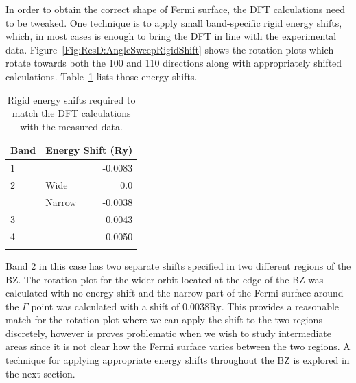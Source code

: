 In order to obtain the correct shape of Fermi surface, the \ac{DFT} calculations need to be tweaked. One technique is to apply small band-specific rigid energy shifts, which, in most cases is enough to bring the \ac{DFT} in line with the experimental data. Figure~\ref{Fig:ResD:AngleSweepRigidShift} shows the rotation plots which rotate towards both the 100 and 110 directions along with appropriately shifted calculations. Table~\ref{Tab:ResD:EnergyShifts} lists those energy shifts.
\begin{table}
    \begin{center}
        \caption{Rigid energy shifts required to match the \ac{DFT} calculations with the measured data.}
        \begin{tabular}[htbp]{llr}
\toprule
Band    & \multicolumn{2}{l}{Energy Shift (Ry)} \\
\midrule
1       &       & -0.0083      \\
2       & Wide  & 0.0          \\
        & Narrow & -0.0038     \\
3       &       & 0.0043       \\
4       &       & 0.0050        \\
\bottomrule
        \label{Tab:ResD:EnergyShifts}
        \end{tabular}
    \end{center}
\end{table}

Band $2$ in this case has two separate shifts specified in two different regions of the \ac{BZ}. The rotation plot for the wider orbit located at the edge of the \ac{BZ} was calculated with no energy shift and the narrow part of the Fermi surface around the $\Gamma$ point was calculated with a shift of $\unit{0.0038}{\textrm{Ry}}$. This provides a reasonable match for the rotation plot where we can apply the shift to the two regions discretely, however is proves problematic when we wish to study intermediate areas since it is not clear how the Fermi surface varies between the two regions. A technique for applying appropriate energy shifts throughout the \ac{BZ} is explored in the next section.

